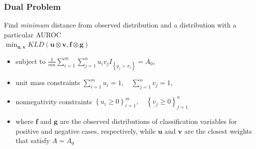 \documentclass{beamer}
\begin{document}
\begin{frame}
\frametitle{Dual Problem}

Find \emph{minimum} distance from observed distribution and a distribution with a particular AUROC \\
$\min_{\mathbf{u}, \mathbf{v}}
        KLD(\mathbf{u} \otimes \mathbf{v}, \mathbf{f} \otimes \mathbf{g})$
\begin{itemize}
    \item subject to
    $\frac{1}{m n} \sum_{i = 1}^{m} \sum_{j = 1}^{n} u_i v_j I_{\left\{ y_j > x_i \right\}} = A_0$,
    \item unit mass constraints
    $\sum_{i = 1}^{m} u_i = 1, \quad \sum_{j = 1}^{n} v_j = 1$,
    \item nonnegativity constraints
    $ \left\{ u_i  \geq 0 \right\}_{i=1}^{m}, \quad \left\{ v_j \geq 0 \right\}_{j=1}^{n}$
    \item where $\mathbf{f}$ and $\mathbf{g}$ are the observed distributions of classification variables for positive and negative cases, respectively,
    while $\mathbf{u}$ and $\mathbf{v}$ are the closest weights that satisfy $A = A_0$
\end{itemize}

\end{frame}

\end{document}
